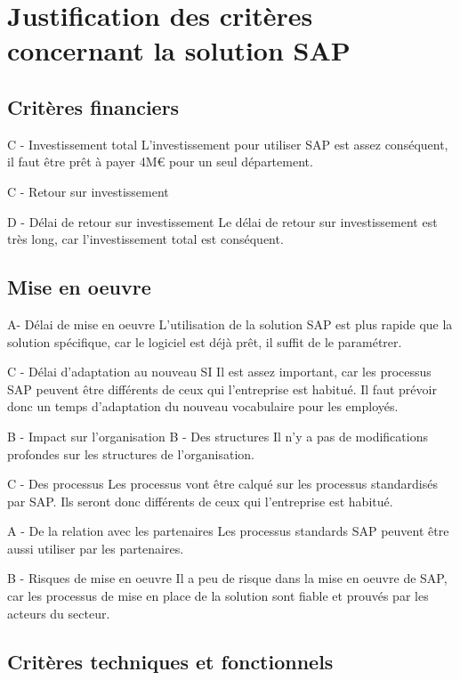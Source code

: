 \section{Justification des critères concernant la solution SAP}

\subsection{Critères financiers}

C - Investissement total
	L'investissement pour utiliser SAP est assez conséquent, il faut être prêt à payer 4M€ pour un seul département.
	
C - Retour sur investissement
		
D - Délai de retour sur investissement
	Le délai de retour sur investissement est très long, car l'investissement total est conséquent.
	
\subsection{Mise en oeuvre}

A- Délai de mise en oeuvre
	L'utilisation de la solution SAP est plus rapide que la solution spécifique, car le logiciel est déjà prêt, il suffit de le paramétrer.

C - Délai d'adaptation au nouveau SI
	Il est assez important, car les processus SAP peuvent être différents de ceux qui l'entreprise est habitué. Il faut prévoir donc un temps d'adaptation du nouveau vocabulaire pour les employés.

B - Impact sur l'organisation
	B - Des structures
		Il n'y a pas de modifications profondes sur les structures de l'organisation.
		
	C - Des processus
		Les processus vont être calqué sur les processus standardisés par SAP. Ils seront donc différents de ceux qui l'entreprise est habitué.

	A - De la relation avec les partenaires
		Les processus standards SAP peuvent être aussi utiliser par les partenaires.

B - Risques de mise en oeuvre
	Il a peu de risque dans la mise en oeuvre de SAP, car les processus de mise en place de la solution sont fiable et prouvés par les acteurs du secteur. 
	

\subsection{Critères techniques et fonctionnels}

